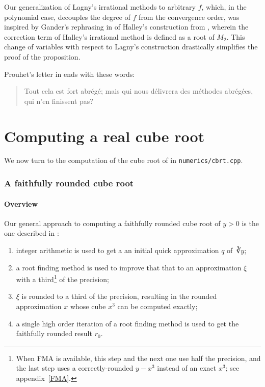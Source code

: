 ﻿\documentclass[10pt, a4paper, twoside]{basestyle}
\begin{document}
Our generalization of Lagny's irrational methods to arbitrary $f$, which, in the polynomial case,
decouples the degree of $f$ from the convergence order, was inspired by Gander's rephrasing in
\cite{Gander1985} of Halley's construction from \cite{Halley1694}, wherein the correction term of
Halley's irrational method is defined as a root of $M_2$. This change of variables with respect to
Lagny's construction drastically simplifies the proof of the proposition.

Prouhet’s letter in \cite{Cantor1861} ends with these words:
\begin{quote}\textfrench{%
Tout cela est fort abrégé; mais qui nous délivrera des méthodes abrégées,
qui n'en finissent pas?}\end{quote}

\part{Computing a real cube root}
\label{CubeRoot}

We now turn to the computation of the cube root of in \texttt{numerics/cbrt.cpp}.

\section*{A faithfully rounded cube root}
\subsection*{Overview}
Our general approach to computing a faithfully rounded cube root of $y>0$ is the one described in \cite{KahanBindel2001}:
\begin{enumerate}
\item integer arithmetic is used to get a an initial quick approximation $q$ of $\cuberoot y$;
\item a root finding method is used to improve that that to an approximation $ξ$ with a third\footnote{When FMA is available,
this step and the next one use half the precision, and the last step uses a correctly-rounded $y-x^3$ instead of an
exact $x^3$; see appendix~\ref{FMA}.} of the precision;
\item $ξ$ is rounded to a third of the precision, resulting in the rounded approximation $x$ whose cube $x^3$ can be computed exactly;
\item a single high order iteration of a root finding method is used to get the faithfully rounded result $r_0$.
\end{enumerate} 
\end{document}
